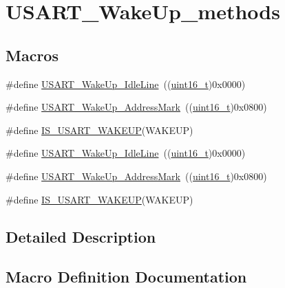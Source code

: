\hypertarget{group___u_s_a_r_t___wake_up__methods}{}\section{U\+S\+A\+R\+T\+\_\+\+Wake\+Up\+\_\+methods}
\label{group___u_s_a_r_t___wake_up__methods}
\subsection*{Macros}
\begin{DoxyCompactItemize}
\item 
\#define \hyperlink{group___u_s_a_r_t___wake_up__methods_ga9646d71590d5cef29ee12da0bb431d92}{U\+S\+A\+R\+T\+\_\+\+Wake\+Up\+\_\+\+Idle\+Line}~((\hyperlink{_p_e___types_8h_a1f1825b69244eb3ad2c7165ddc99c956}{uint16\+\_\+t})0x0000)
\item 
\#define \hyperlink{group___u_s_a_r_t___wake_up__methods_ga9f63c1671060682adee91b9a2f3202e4}{U\+S\+A\+R\+T\+\_\+\+Wake\+Up\+\_\+\+Address\+Mark}~((\hyperlink{_p_e___types_8h_a1f1825b69244eb3ad2c7165ddc99c956}{uint16\+\_\+t})0x0800)
\item 
\#define \hyperlink{group___u_s_a_r_t___wake_up__methods_ga3611be417bdb82f42dc2ca17584271f9}{I\+S\+\_\+\+U\+S\+A\+R\+T\+\_\+\+W\+A\+K\+E\+UP}(W\+A\+K\+E\+UP)
\item 
\#define \hyperlink{group___u_s_a_r_t___wake_up__methods_ga9646d71590d5cef29ee12da0bb431d92}{U\+S\+A\+R\+T\+\_\+\+Wake\+Up\+\_\+\+Idle\+Line}~((\hyperlink{_p_e___types_8h_a1f1825b69244eb3ad2c7165ddc99c956}{uint16\+\_\+t})0x0000)
\item 
\#define \hyperlink{group___u_s_a_r_t___wake_up__methods_ga9f63c1671060682adee91b9a2f3202e4}{U\+S\+A\+R\+T\+\_\+\+Wake\+Up\+\_\+\+Address\+Mark}~((\hyperlink{_p_e___types_8h_a1f1825b69244eb3ad2c7165ddc99c956}{uint16\+\_\+t})0x0800)
\item 
\#define \hyperlink{group___u_s_a_r_t___wake_up__methods_ga3611be417bdb82f42dc2ca17584271f9}{I\+S\+\_\+\+U\+S\+A\+R\+T\+\_\+\+W\+A\+K\+E\+UP}(W\+A\+K\+E\+UP)
\end{DoxyCompactItemize}


\subsection{Detailed Description}


\subsection{Macro Definition Documentation}
